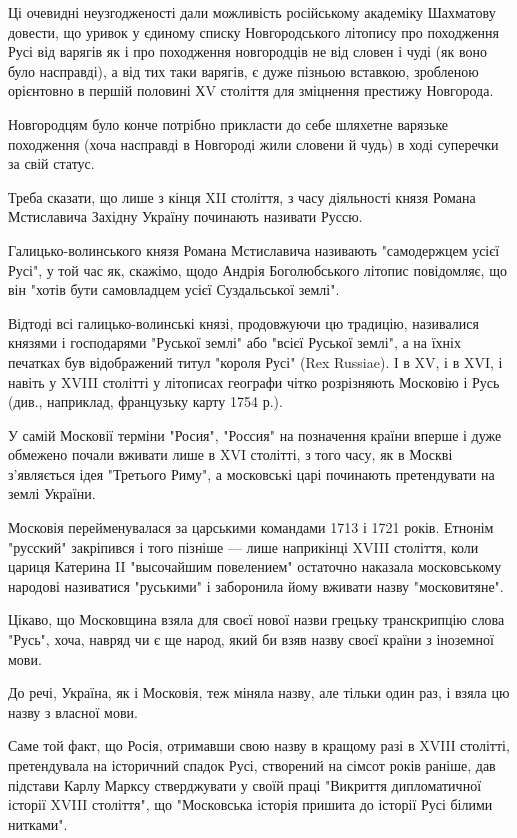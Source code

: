 Ці очевидні неузгодженості дали можливість російському академіку Шахматову
довести, що уривок у єдиному списку Новгородського літопису про походження Русі
від варягів як і про походження новгородців не від словен і чуді (як воно було
насправді), а від тих таки варягів, є дуже пізньою вставкою, зробленою
орієнтовно в першій половині ХV століття для зміцнення престижу Новгорода.

Новгородцям було конче потрібно прикласти до себе шляхетне варязьке походження
(хоча насправді в Новгороді жили словени й чудь) в ході суперечки за свій
статус.

Треба сказати, що лише з кінця XII століття, з часу діяльності князя Романа
Мстиславича Західну Україну починають називати Руссю.

Галицько-волинського князя Романа Мстиславича називають "самодержцем усієї
Русі", у той час як, скажімо, щодо Андрія Боголюбського літопис повідомляє, що
він "хотів бути самовладцем усієї Суздальської землі".

Відтоді всі галицько-волинські князі, продовжуючи цю традицію, називалися
князями і господарями "Руської землі" або "всієї Руської землі", а на їхніх
печатках був відображений титул "короля Русі" (Rex Russiae). І в XV, і в XVI, і
навіть у XVIII столітті у літописах географи чітко розрізняють Московію і Русь
(див., наприклад, французьку карту 1754 р.).

У самій Московії терміни "Росия", "Россия" на позначення країни вперше і дуже
обмежено почали вживати лише в XVI столітті, з того часу, як в Москві
з'являється ідея "Третього Риму", а московські царі починають претендувати на
землі України.

Московія перейменувалася за царськими командами 1713 і 1721 років. Етнонім
"русский" закріпився і того пізніше --- лише наприкінці XVIII століття, коли
цариця Катерина II "высочайшим повелением" остаточно наказала московському
народові називатися "руськими" і заборонила йому вживати назву "московитяне".

Цікаво, що Московщина взяла для своєї нової назви грецьку транскрипцію слова
"Русь", хоча, навряд чи є ще народ, який би взяв назву своєї країни з іноземної
мови.

До речі, Україна, як і Московія, теж міняла назву, але тільки один раз, і взяла
цю назву з власної мови.

Саме той факт, що Росія, отримавши свою назву в кращому разі в XVIIІ столітті,
претендувала на історичний спадок Русі, створений на сімсот років раніше, дав
підстави Карлу Марксу стверджувати у своїй праці "Викриття дипломатичної
історії XVIII століття", що "Московська історія пришита до історії Русі білими
нитками".

